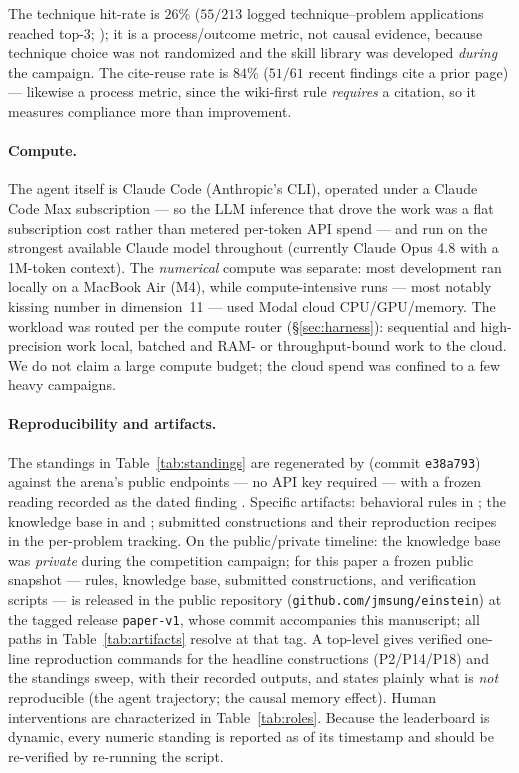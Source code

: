 \documentclass[11pt]{article}
\begin{document}
The technique hit-rate is $26\%$ ($55/213$ logged technique--problem applications reached
top-3; ); it is a process/outcome metric, not causal
evidence, because technique choice was not randomized and the skill library was developed
\emph{during} the campaign. The cite-reuse rate is $84\%$ ($51/61$ recent findings cite a prior
page) --- likewise a process metric, since the wiki-first rule \emph{requires} a citation, so
it measures compliance more than improvement.

\paragraph{Compute.}
The agent itself is Claude Code (Anthropic's CLI), operated under a Claude Code Max
subscription --- so the LLM inference that drove the work was a flat subscription cost rather
than metered per-token API spend --- and run on the strongest available Claude model
throughout (currently Claude Opus 4.8 with a 1M-token context). The \emph{numerical} compute was
separate: most development ran locally on a MacBook Air (M4), while compute-intensive runs ---
most notably kissing number in dimension~11 --- used Modal cloud CPU/GPU/memory. The workload
was routed per the compute router (\S\ref{sec:harness}): sequential and high-precision work
local, batched and RAM- or throughput-bound work to the cloud. We do not claim a large compute
budget; the cloud spend was confined to a few heavy campaigns.

\paragraph{Reproducibility and artifacts.}
\sloppy
The standings in Table~\ref{tab:standings} are regenerated by
 (commit \texttt{e38a793}) against the arena's public
endpoints --- no API key required --- with a frozen reading recorded as the dated finding
. Specific artifacts:
behavioral rules in ; the knowledge base in  and
; submitted constructions and their reproduction recipes in the
per-problem tracking. On the public/private timeline: the knowledge base was \emph{private}
during the competition campaign; for this paper a frozen public snapshot --- rules, knowledge
base, submitted constructions, and verification scripts --- is released in the public
repository (\texttt{github.com/jmsung/einstein}) at the tagged release \texttt{paper-v1}, whose
commit accompanies this manuscript; all paths in Table~\ref{tab:artifacts} resolve at that tag.
A top-level  gives verified one-line reproduction commands for the headline
constructions (P2/P14/P18) and the standings sweep, with their recorded outputs, and states
plainly what is \emph{not} reproducible (the agent trajectory; the causal memory effect).
Human interventions are characterized in Table~\ref{tab:roles}. Because the leaderboard is
dynamic, every numeric standing is reported as of its timestamp and should be re-verified by
re-running the script.
\end{document}
